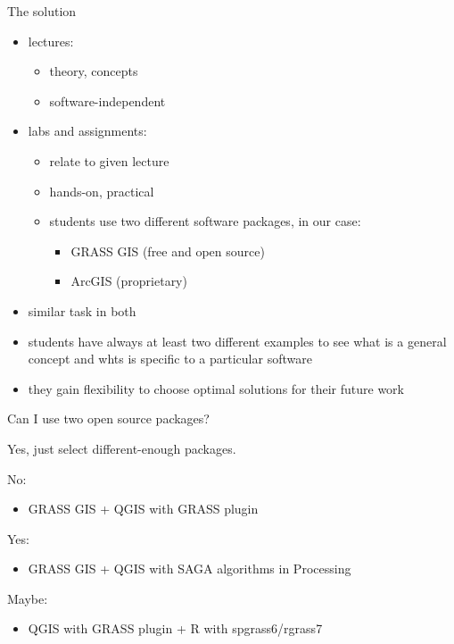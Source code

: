 \documentclass[xcolor={dvipsnames,usenames},beamer]{beamer}
\begin{document}
\begin{frame}{The solution}

\begin{itemize}
 \item lectures:
 \begin{itemize}
  \item theory, concepts
  \item software-independent
 \end{itemize}
 \item labs and assignments:
 \begin{itemize}
  \item relate to given lecture
  \item hands-on, practical
  \item \alert<1>{students use two different software packages}\pause, in our case:
  \begin{itemize}
   \item GRASS GIS (free and open source)
   \item ArcGIS (proprietary)
  \end{itemize}
 \end{itemize}
  \pause
  \item similar task in both
  \item students have always at least two different examples to see
    what is a general concept and whts is specific to a particular software
  \item they gain flexibility to choose optimal solutions for their future work
\end{itemize}

\end{frame}


\begin{frame}{Can I use two open source packages?}

Yes, just select different-enough packages.

\bigskip

No:
\begin{itemize}
 \item GRASS GIS + QGIS with GRASS plugin %
\end{itemize}


Yes:
\begin{itemize}
 \item GRASS GIS + QGIS with SAGA algorithms in Processing
\end{itemize}

Maybe:
\begin{itemize}
 \item QGIS with GRASS plugin + R with spgrass6/rgrass7
\end{itemize}

\end{frame}
\end{document}
